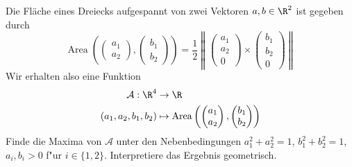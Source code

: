 \begin{prob}
Die Fläche eines Dreiecks aufgespannt von zwei Vektoren $a,b \in \R^2$ ist gegeben durch
$$\operatorname{Area}\left(\begin{pmatrix}a_1 \\ a_2\end{pmatrix},\begin{pmatrix}b_1 \\ b_2\end{pmatrix}\right) = \frac{1}{2} \left\rVert \begin{pmatrix}a_1 \\ a_2 \\ 0\end{pmatrix} \times \begin{pmatrix}b_1 \\ b_2 \\ 0\end{pmatrix}\right\rVert$$
Wir erhalten also eine Funktion 
\begin{equation*}
        \begin{split}
            \mathcal{A}:\R^4&\to\R\\
            (a_1, a_2, b_1, b_2) &\mapsto \operatorname{Area}\left(\begin{pmatrix}a_1 \\ a_2 \end{pmatrix}, \begin{pmatrix}b_1 \\ b_2 \end{pmatrix}\right)
        \end{split}
    \end{equation*}
Finde die Maxima von $\mathcal{A}$ unter den Nebenbedingungen $a_1^2+a_2^2=1$, $b_1^2+b_2^2=1$, $a_i,b_i>0$ f"ur $i\in\{1,2\}$.
Interpretiere das Ergebnis geometrisch.
\end{prob}
